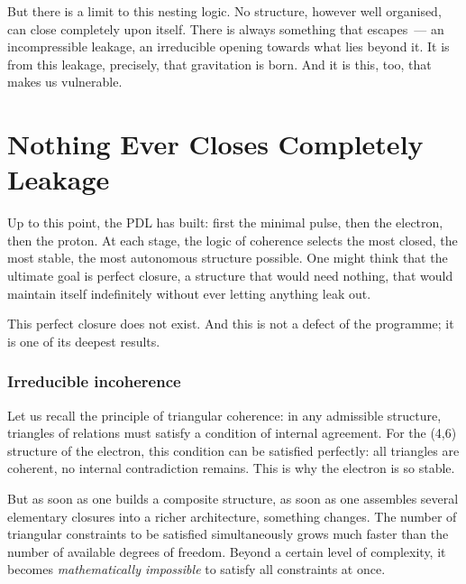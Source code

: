 \documentclass[12pt, a4paper, openright]{book}
\begin{document}
\medskip

But there is a limit to this nesting logic. No structure, however well organised, can close completely upon itself. There is always something that escapes~--- an incompressible leakage, an irreducible opening towards what lies beyond it. It is from this leakage, precisely, that gravitation is born. And it is this, too, that makes us vulnerable.

\chapter[Nothing Ever Closes Completely --- Leakage]{Nothing Ever Closes Completely \\ Leakage}

Up to this point, the PDL has built: first the minimal pulse, then the electron, then the proton. At each stage, the logic of coherence selects the most closed, the most stable, the most autonomous structure possible. One might think that the ultimate goal is perfect closure, a structure that would need nothing, that would maintain itself indefinitely without ever letting anything leak out.

\medskip

This perfect closure does not exist. And this is not a defect of the programme; it is one of its deepest results.

\subsection*{Irreducible incoherence}

Let us recall the principle of triangular coherence: in any admissible structure, triangles of relations must satisfy a condition of internal agreement. For the (4,6) structure of the electron, this condition can be satisfied perfectly: all triangles are coherent, no internal contradiction remains. This is why the electron is so stable.

\medskip

But as soon as one builds a composite structure, as soon as one assembles several elementary closures into a richer architecture, something changes. The number of triangular constraints to be satisfied simultaneously grows much faster than the number of available degrees of freedom. Beyond a certain level of complexity, it becomes \emph{mathematically impossible} to satisfy all constraints at once.

\medskip
\end{document}
